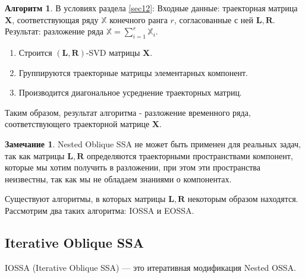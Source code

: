 \documentclass[specialist, substylefile = spbureport.rtx, subf,href,colorlinks=true, 12pt]{disser}
\theoremstyle{definition}
\newtheorem{algorithm}{Алгоритм}
\newtheorem{remark}{Замечание}
\begin{document}
\begin{algorithm}
    В условиях раздела \ref{sec12}:
    Входные данные: траекторная матрица $\mathbf{X}$, соответствующая ряду $\mathbb{X}$ конечного ранга $r$, согласованные с ней $\mathbf{L}, \mathbf{R}$.\\
    Результат: разложение ряда $\mathbb{X} = \sum_{i = 1}^{r}\mathbb{X}_i$. 
\end{algorithm}
    \begin{enumerate}
        \item Строится $(\mathbf{L}, \mathbf{R})$-SVD матрицы $\mathbf{X}$.
        \item Группируются траекторные матрицы элементарных компонент.
        \item Производится диагональное усреднение траекторных матриц.
    \end{enumerate}
    Таким образом, результат алгоритма - разложение временного ряда, соответствующего траекторной матрице $\mathbf{X}$.
    \begin{remark}
    Nested Oblique SSA не может быть применен для реальных задач, так как матрицы $\mathbf{L}, \mathbf{R}$ определяются траекторными пространствами компонент, которые мы хотим получить в разложении, при этом эти пространства неизвестны, так как мы не обладаем знаниями о компонентах.
    \end{remark}
    Существуют алгоритмы, в которых матрицы $\mathbf{L}, \mathbf{R}$ некоторым образом находятся. Рассмотрим два таких алгоритма: IOSSA и EOSSA.
\subsection{Iterative Oblique SSA}
    IOSSA (Iterative Oblique SSA) --- это итеративная модификация Nested OSSA. 
    
\end{document}

